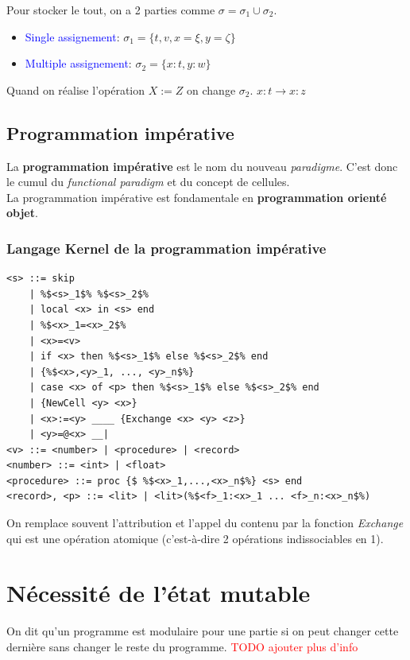 \documentclass{report}
\begin{document}
Pour stocker le tout, on a 2 parties comme $\sigma = \sigma_1 \cup \sigma_2$.
\begin{itemize}
\item \textcolor{blue}{Single assignement}: $\sigma_1 = \{t,v,x=\xi,y = \zeta\}$
\item \textcolor{blue}{Multiple assignement}: $\sigma_2 = \{x:t, y:w\}$
\end{itemize}
Quand on réalise l'opération $X:=Z$ on change $\sigma_2$. $x:t \rightarrow x:z$

\subsection{Programmation impérative}
La \textbf{programmation impérative} est le nom du nouveau \textit{paradigme}. C'est donc le cumul du \textit{functional paradigm} et du concept de cellules.\\
La programmation impérative est fondamentale en \textbf{programmation orienté objet}.

\subsubsection{Langage Kernel de la programmation impérative}
\begin{lstlisting}[escapechar=\%]
<s> ::= skip 
	| %$<s>_1$% %$<s>_2$% 
	| local <x> in <s> end 
	| %$<x>_1=<x>_2$%
	| <x>=<v> 
	| if <x> then %$<s>_1$% else %$<s>_2$% end 
	| {%$<x>,<y>_1, ..., <y>_n$%} 
	| case <x> of <p> then %$<s>_1$% else %$<s>_2$% end 
	| {NewCell <y> <x>} 
	| <x>:=<y> ____ {Exchange <x> <y> <z>}
	| <y>=@<x> __|
<v> ::= <number> | <procedure> | <record> 
<number> ::= <int> | <float> 
<procedure> ::= proc {$ %$<x>_1,...,<x>_n$%} <s> end
<record>, <p> ::= <lit> | <lit>(%$<f>_1:<x>_1 ... <f>_n:<x>_n$%)
\end{lstlisting}
On remplace souvent l'attribution et l'appel du contenu par la fonction \textit{Exchange} qui est une opération atomique (c'est-à-dire 2 opérations indissociables en 1).

\section{Nécessité de l'état mutable}
On dit qu'un programme est modulaire pour une partie si on peut changer cette dernière sans changer le reste du programme.
\textcolor{red}{TODO ajouter plus d'info}
\end{document}
